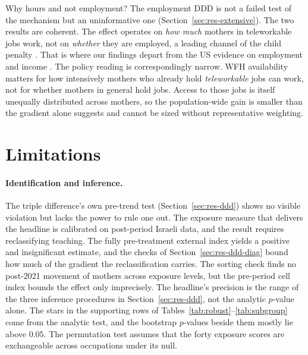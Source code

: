 \documentclass[12pt,a4paper]{article}
\begin{document}
\noindent Why hours and not employment? The employment DDD is not a failed test of the mechanism but an
uninformative one (Section~\ref{sec:res-extensive}). The two results are coherent. The effect
operates on \emph{how much} mothers in teleworkable jobs work, not on \emph{whether} they are
employed, a leading channel of the child penalty \citep{kleven2019denmark}. That is where our
findings depart from the US evidence on employment and income \citep{harrington2025}. The policy
reading is correspondingly narrow. WFH availability matters for how intensively mothers who
already hold \emph{teleworkable} jobs can work, not for whether mothers in general hold jobs.
Access to those jobs is itself unequally distributed across mothers, so the population-wide gain
is smaller than the gradient alone suggests and cannot be sized without representative
weighting.

\section{Limitations}\label{sec:limitations}

\paragraph{Identification and inference.}
The triple difference's own pre-trend test (Section~\ref{sec:res-ddd}) shows no visible
violation but lacks the power to rule one out. The exposure measure that delivers the headline
is calibrated on post-period Israeli data, and the result requires reclassifying teaching. The
fully pre-treatment external index yields a positive and insignificant estimate, and the checks
of Section~\ref{sec:res-ddd-diag} bound how much of the gradient the reclassification carries.
The sorting check finds no post-2021 movement of mothers across exposure levels, but the
pre-period cell index bounds the effect only imprecisely. The headline's precision is the range
of the three inference procedures in Section~\ref{sec:res-ddd}, not the analytic $p$-value
alone. The stars in the supporting rows of Tables~\ref{tab:robust}--\ref{tab:subgroup} come from
the analytic test, and the bootstrap $p$-values beside them mostly lie above $0.05$. The
permutation test assumes that the forty exposure scores are exchangeable across occupations
under its null.
\end{document}
